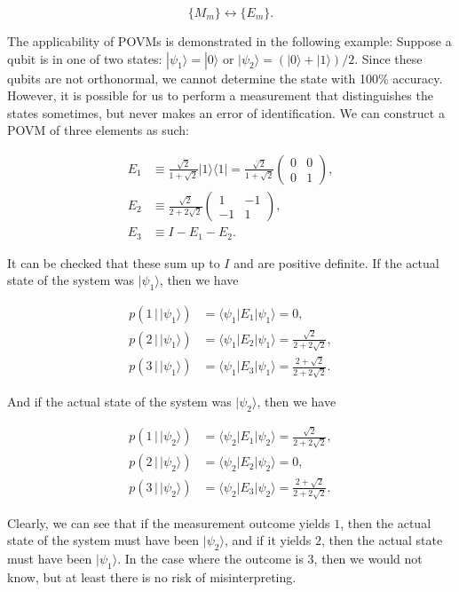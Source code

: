 \documentclass{article}
\begin{document}
        \[\{M_m\} \longleftrightarrow \{E_m\}.\]

      The applicability of POVMs is demonstrated in the following example: Suppose a qubit is in one of two states: $|\psi_1 \rangle = |0 \rangle$ or $|\psi_2 \rangle = (|0 \rangle + |1 \rangle)/2$. Since these qubits are not orthonormal, we cannot determine the state with 100\% accuracy. However, it is possible for us to perform a measurement that distinguishes the states sometimes, but never makes an error of identification. We can construct a POVM of three elements as such:

      \begin{align*}
        E_1 & \equiv \frac{\sqrt{2}}{1 + \sqrt{2}} |1\rangle \langle 1| = \frac{\sqrt{2}}{1 + \sqrt{2}} \begin{pmatrix} 0&0\\0&1 \end{pmatrix}, \\
        E_2 & \equiv \frac{\sqrt{2}}{2 + 2 \sqrt{2}} \begin{pmatrix} 1 & -1 \\ -1 & 1 \end{pmatrix}, \\
        E_3 & \equiv I - E_1 - E_2.
      \end{align*}

      It can be checked that these sum up to $I$ and are positive definite. If the actual state of the system was $|\psi_1 \rangle$, then we have

      \begin{align*}
        p(1 \,|\, |\psi_1 \rangle) & = \langle \psi_1 | E_1 | \psi_1 \rangle = 0, \\
        p(2 \,|\, |\psi_1 \rangle) & = \langle \psi_1 | E_2 | \psi_1 \rangle = \frac{\sqrt{2}}{2 + 2\sqrt{2}}, \\
        p(3 \,|\, |\psi_1 \rangle) & = \langle \psi_1 | E_3 | \psi_1 \rangle =  \frac{2 + \sqrt{2}}{2 + 2\sqrt{2}}.
      \end{align*}

      And if the actual state of the system was $|\psi_2 \rangle$, then we have

      \begin{align*}
        p(1 \,|\, |\psi_2 \rangle) & = \langle \psi_2 | E_1 | \psi_2 \rangle = \frac{\sqrt{2}}{2 + 2\sqrt{2}}, \\
        p(2 \,|\, |\psi_2 \rangle) & = \langle \psi_2 | E_2 | \psi_2 \rangle = 0, \\
        p(3 \,|\, |\psi_2 \rangle) & = \langle \psi_2 | E_3 | \psi_2 \rangle =  \frac{2 + \sqrt{2}}{2 + 2\sqrt{2}}.
      \end{align*}

      Clearly, we can see that if the measurement outcome yields $1$, then the actual state of the system must have been $|\psi_2\rangle$, and if it yields $2$, then the actual state must have been $|\psi_1 \rangle$. In the case where the outcome is $3$, then we would not know, but at least there is no risk of misinterpreting.  
\end{document}
